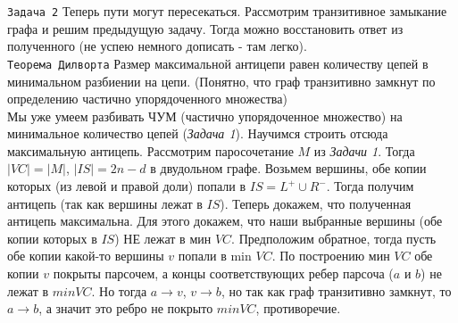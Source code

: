 \documentclass{article}
\newcommand{\ti}[1]{\textit{#1}}
\newcommand{\abs}[1]{\left|{#1}\right|}
\begin{document}
\verb'Задача 2'
Теперь пути могут пересекаться. Рассмотрим транзитивное замыкание графа и решим предыдущую задачу. Тогда можно восстановить ответ из полученного (не успею немного дописать - там легко). \\

\verb'Теорема Дилворта' Размер максимальной антицепи равен количеству цепей в минимальном разбиении на цепи. (Понятно, что граф транзитивно замкнут по определению частично упорядоченного множества) \\
Мы уже умеем разбивать ЧУМ (частично упорядоченное множество) на минимальное количество цепей (\ti{Задача 1}). Научимся строить отсюда максимальную антицепь. Рассмотрим паросочетание $M$ из \ti{Задачи 1}. Тогда $\abs{VC} = \abs{M}$, $\abs{IS} = 2n - d$ в двудольном графе. Возьмем вершины, обе копии которых (из левой и правой доли) попали в $IS = L^+ \cup R^-$. Тогда получим антицепь (так как вершины лежат в $IS$). Теперь докажем, что полученная антицепь максимальна. Для этого докажем, что наши выбранные вершины (обе копии которых в $IS$) НЕ лежат в мин $VC$. Предположим обратное, тогда пусть обе копии какой-то вершины $v$ попали в min $VC$. По построению мин $VC$ обе копии $v$ покрыты парсочем, а концы соответствующих ребер парсоча ($a$ и $b$) не лежат в $min VC$. Но тогда $a \rightarrow v$, $v \rightarrow b$, но так как граф транзитивно замкнут, то $a \rightarrow b$, а значит это ребро не покрыто $min VC$, противоречие. \\ 
\end{document}
